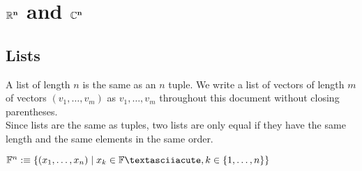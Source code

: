 \section{$\mathbf{\mathbb{R}^n}$ and $\mathbf{\mathbb{C}^n}$}

\subsection{Lists}
\setcounter{thm}{7}
\begin{mydef}
  A list of length $n$ is the same as an $n$ tuple. We write a list of vectors of length $m$ of vectors $(v_1, \ldots, v_m)$ as $v_1, \ldots, v_m$ throughout this document without closing parentheses. \\
  Since lists are the same as tuples, two lists are only equal if they have the same length and the same elements in the same order.
\end{mydef}

\begin{mydef}
  $\myF^n :\equiv \left \{ (x_1, \dots, x_n) \mid x_k \in \myF´, k \in \{1, \dots, n\} \right \}$
\end{mydef}